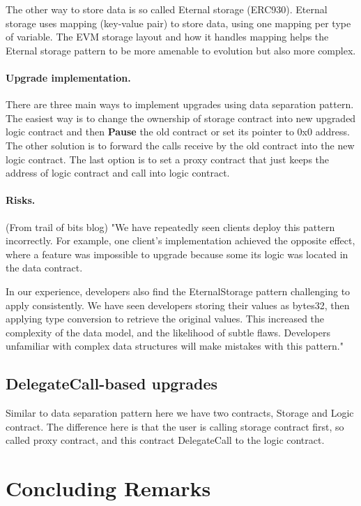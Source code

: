 The other way to store data is so called Eternal storage (ERC930). Eternal storage uses mapping (key-value pair) to store data, using one mapping per type of variable. The EVM storage layout and how it handles mapping helps the Eternal storage pattern to be more amenable to evolution but also more complex.

\paragraph{Upgrade implementation. } There are three main ways to implement upgrades using data separation pattern. The easiest way is to change the ownership of storage contract into new upgraded logic contract and then \textbf{Pause} the old contract or set its pointer to 0x0 address. The other solution is to forward the calls receive by the old contract into the new logic contract. The last option is to set a proxy contract that just keeps the address of logic contract and call into logic contract.

\paragraph{Risks. } (From trail of bits blog)
"We have repeatedly seen clients deploy this pattern incorrectly. For example, one client’s implementation achieved the opposite effect, where a feature was impossible to upgrade because some its logic was located in the data contract.

In our experience, developers also find the EternalStorage pattern challenging to apply consistently. We have seen developers storing their values as bytes32, then applying type conversion to retrieve the original values. This increased the complexity of the data model, and the likelihood of subtle flaws. Developers unfamiliar with complex data structures will make mistakes with this pattern."



\subsection{DelegateCall-based upgrades}
Similar to data separation pattern here we have two contracts, Storage and Logic contract. The difference here is that the user is calling storage contract first, so called proxy contract, and this contract DelegateCall to the logic contract. 

\section{Concluding Remarks}

